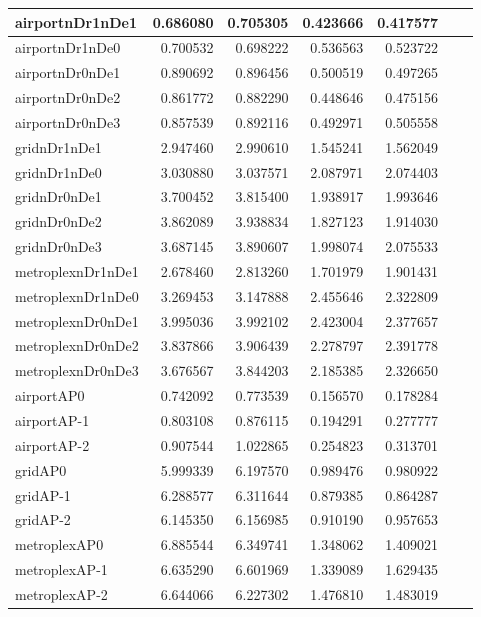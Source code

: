\begin{longtable}{|l|r|r|r|r|r|r|}
\endlastfoot
airportnDr1nDe1 & 0.686080 & 0.705305 & 0.423666 & 0.417577 \\ \hline
airportnDr1nDe0 & 0.700532 & 0.698222 & 0.536563 & 0.523722 \\ \hline
airportnDr0nDe1 & 0.890692 & 0.896456 & 0.500519 & 0.497265 \\ \hline
airportnDr0nDe2 & 0.861772 & 0.882290 & 0.448646 & 0.475156 \\ \hline
airportnDr0nDe3 & 0.857539 & 0.892116 & 0.492971 & 0.505558 \\ \hline
gridnDr1nDe1 & 2.947460 & 2.990610 & 1.545241 & 1.562049 \\ \hline
gridnDr1nDe0 & 3.030880 & 3.037571 & 2.087971 & 2.074403 \\ \hline
gridnDr0nDe1 & 3.700452 & 3.815400 & 1.938917 & 1.993646 \\ \hline
gridnDr0nDe2 & 3.862089 & 3.938834 & 1.827123 & 1.914030 \\ \hline
gridnDr0nDe3 & 3.687145 & 3.890607 & 1.998074 & 2.075533 \\ \hline
metroplexnDr1nDe1 & 2.678460 & 2.813260 & 1.701979 & 1.901431 \\ \hline
metroplexnDr1nDe0 & 3.269453 & 3.147888 & 2.455646 & 2.322809 \\ \hline
metroplexnDr0nDe1 & 3.995036 & 3.992102 & 2.423004 & 2.377657 \\ \hline
metroplexnDr0nDe2 & 3.837866 & 3.906439 & 2.278797 & 2.391778 \\ \hline
metroplexnDr0nDe3 & 3.676567 & 3.844203 & 2.185385 & 2.326650 \\ \hline
airportAP0 & 0.742092 & 0.773539 & 0.156570 & 0.178284 \\ \hline
airportAP-1 & 0.803108 & 0.876115 & 0.194291 & 0.277777 \\ \hline
airportAP-2 & 0.907544 & 1.022865 & 0.254823 & 0.313701 \\ \hline
gridAP0 & 5.999339 & 6.197570 & 0.989476 & 0.980922 \\ \hline
gridAP-1 & 6.288577 & 6.311644 & 0.879385 & 0.864287 \\ \hline
gridAP-2 & 6.145350 & 6.156985 & 0.910190 & 0.957653 \\ \hline
metroplexAP0 & 6.885544 & 6.349741 & 1.348062 & 1.409021 \\ \hline
metroplexAP-1 & 6.635290 & 6.601969 & 1.339089 & 1.629435 \\ \hline
metroplexAP-2 & 6.644066 & 6.227302 & 1.476810 & 1.483019 \\ \hline

\end{longtable}
